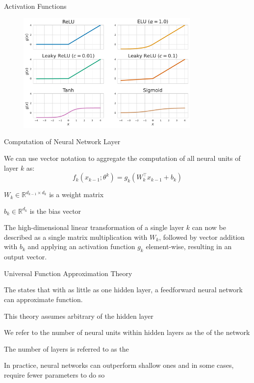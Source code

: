 \begin{frame}{Activation Functions}

\begin{figure}
    \centering
    \includegraphics[width = 0.8\textwidth, keepaspectratio]{images/chapter_7/activation_functions.pdf}
    \end{figure}
\end{frame}

\begin{frame}[t]{Computation of Neural Network Layer}

We can use vector notation to aggregate the computation of all neural units of layer $k$ as:
\vspace{0pt}
\[
f_k(x_{k-1}; \theta^k) = g_k(W_k^\top x_{k-1} + b_k)
\]

\blist
    \item $W_k \in \mathbb{R}^{d_{k-1} \times d_k}$ is a weight matrix
    \item $b_k \in \mathbb{R}^{d_k}$ is the bias vector
\elist

The high-dimensional linear transformation of a single layer $k$ can now be described as a single matrix multiplication with $W_k$, followed by vector addition with $b_k$ and applying an activation function $g_k$ element-wise, resulting in an output vector.
    
\end{frame}

\begin{frame}[t]{Universal Function Approximation Theory}

The  states that with as little as one hidden layer, a feedforward neural network can approximate  function. 
\vspace{3pt}
\blist
    \item This theory assumes arbitrary  of the hidden layer
    \item We refer to the number of neural units within hidden layers as the  of the network
    \item The number of layers is referred to as the 
    \item In practice,  neural networks can outperform shallow ones and in some cases, require fewer parameters to do so
\elist
    
\end{frame}

